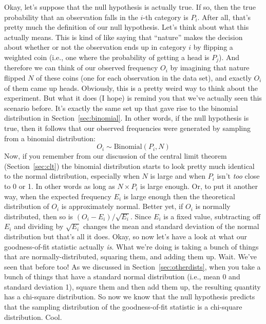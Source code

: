 Okay, let's suppose that the null hypothesis is actually true. If so, then the true probability that an observation falls in the $i$-th category is $P_i$. After all, that's pretty much the definition of our null hypothesis. Let's think about what this actually means. This is kind of like saying that ``nature'' makes the decision about whether or not the observation ends up in category $i$ by flipping a weighted coin (i.e., one where the probability of getting a head is $P_j$). And therefore we can think of our observed frequency $O_i$ by imagining that nature flipped $N$ of these coins (one for each observation in the data set), and exactly $O_i$ of them came up heads. Obviously, this is a pretty weird way to think about the experiment. But what it does (I hope) is remind you that we've actually seen this scenario before. It's exactly the same set up that gave rise to the binomial distribution in Section~\ref{sec:binomial}. In other words, if the null hypothesis is true, then it follows that our observed frequencies were generated by sampling from a binomial distribution:
$$
O_i \sim \mbox{Binomial}(P_i, N)
$$
Now, if you remember from our discussion of the central limit theorem (Section~\ref{sec:clt}) the binomial distribution starts to look pretty much identical to the normal distribution, especially when $N$ is large and when $P_i$ isn't {\it too} close to 0 or 1. In other words as long as $N \times P_i$ is large enough. Or, to put it another way, when the expected frequency $E_i$ is large enough then the theoretical distribution of $O_i$ is approximately normal. Better yet, if $O_i$ is normally distributed, then so is $(O_i - E_i)/\sqrt{E_i}$. Since $E_i$ is a fixed value, subtracting off $E_i$ and dividing by $\sqrt{E_i}$ changes the mean and standard deviation of the normal distribution but that's all it does. Okay, so now let's have a look at what our goodness-of-fit statistic actually {\it is}. What we're doing is taking a bunch of things that are normally-distributed, squaring them, and adding them up. Wait. We've seen that before too! As we discussed in Section~\ref{sec:otherdists}, when you take a bunch of things that have a standard normal distribution (i.e., mean 0 and standard deviation 1), square them and then add them up, the resulting quantity has a chi-square distribution. So now we know that the null hypothesis predicts that the sampling distribution of the goodness-of-fit statistic is a chi-square distribution. Cool. 

